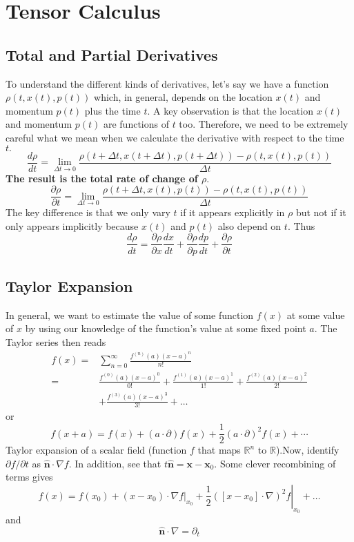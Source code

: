 \chapter{Tensor Calculus}

\section{Total and Partial Derivatives}
To understand the different kinds of derivatives, let's say we have a function $\rho(t, x(t), p(t))$ which, in general, depends on the location $x(t)$ and momentum $p(t)$ plus the time $t.$ A key observation is that the location $x(t)$ and momentum $p(t)$ are functions of $t$ too. Therefore, we need to be extremely careful what we mean when we calculate the derivative with respect to the time $t .$
$$
\frac{d \rho}{d t}=\lim _{\Delta t \rightarrow 0} \frac{\rho(t+\Delta t, x(t+\Delta t), p(t+\Delta t))-\rho(t, x(t), p(t))}{\Delta t}
$$
\textbf{The result is the total rate of change of $\rho$}.
$$
\frac{\partial \rho}{\partial t}=\lim _{\Delta t \rightarrow 0} \frac{\rho(t+\Delta t, x(t), p(t))-\rho(t, x(t), p(t))}{\Delta t}
$$
The key difference is that we only vary $t$ if it appears explicitly
in $\rho$ but not if it only appears implicitly because $x(t)$ and $p(t)$
also depend on $t .$ Thus
$$
\frac{d \rho}{d t}=\frac{\partial \rho}{\partial x} \frac{d x}{d t}+\frac{\partial \rho}{\partial p} \frac{d p}{d t}+\frac{\partial \rho}{\partial t}
$$
\section{Taylor Expansion}
In general, we want to estimate the value of some function $f(x)$ at some value of $x$ by using our knowledge of the function's value at some fixed point $a .$ The Taylor series then reads
\begin{equation}
\begin{aligned}
f(x)=& \sum_{n=0}^{\infty} \frac{f^{(n)}(a)(x-a)^{n}}{n !} \\
=& \frac{f^{(0)}(a)(x-a)^{0}}{0 !}+\frac{f^{(1)}(a)(x-a)^{1}}{1 !}+\frac{f^{(2)}(a)(x-a)^{2}}{2 !} \\
&+\frac{f^{(3)}(a)(x-a)^{3}}{3 !}+\ldots
\end{aligned}
\end{equation}
or
\begin{equation}
f(x+a)=f(x)+(a \cdot \partial) f(x)+\frac{1}{2}(a \cdot \partial)^{2} f(x)+\cdots
\end{equation}
Taylor expansion of a scalar field (function $f$ that maps $\mathbb{R}^{n}$ to $\mathbb{R}$).Now, identify $\partial f / \partial t$ as $\hat{\boldsymbol{n}} \cdot \nabla f .$ In addition, see that $t \hat{\boldsymbol{n}}=\boldsymbol{x}-\boldsymbol{x}_{0} .$ Some clever recombining of terms gives
\begin{equation}
f(x)=f\left(x_{0}\right)+\left.\left(x-x_{0}\right) \cdot \nabla f\right|_{x_{0}}+\left.\frac{1}{2}\left(\left[x-x_{0}\right] \cdot \nabla\right)^{2} f\right|_{x_{0}}+\ldots
\end{equation}
and
\begin{equation}
\hat{\boldsymbol{n}} \cdot \nabla=\partial_{t}
\end{equation}

